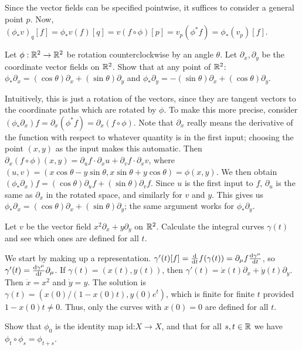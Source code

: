 {Since the vector fields can be specified pointwise, it suffices to consider a general point $p$. 
Now, $(\phi_*v)_q[f]=\phi_*v(f)[q]=v(f\circ\phi)[p]=v_p(\phi^*f)=\phi_*(v_p)[f]$.

\begin{p}
{Let $\phi:\mathbb{R}^2\rightarrow\mathbb{R}^2$ be rotation counterclockwise
by an angle $\theta$. Let $\partial_x,\partial_y$ be the coordinate vector fields on $\mathbb{R}^2$. 
Show that at any point of $\mathbb{R}^2$: $\phi_*\partial_x=(\cos\theta)\partial_x+(\sin\theta)\partial_y$
and $\phi_*\partial_y=-(\sin\theta)\partial_x+(\cos\theta)\partial_y$.}
\end{p}

Intuitively, this is just a rotation of the vectors, since they are tangent vectors to the coordinate paths
which are rotated by $\phi$. To make this more precise, consider $(\phi_*\partial_x)f=\partial_x(\phi^*f)=
\partial_x(f\circ\phi)$. Note that $\partial_x$ really means the derivative of the
function with respect to whatever quantity is in the first input; choosing the point $(x,y)$ as the input
makes this automatic. Then $\partial_x(f\circ\phi)(x,y)=\partial_uf \cdot \partial_x u+\partial_v f\cdot \partial_x v$, where $(u,v)=(x\cos\theta-y\sin\theta,x\sin\theta+y\cos\theta)=\phi(x,y)$. We then obtain
$(\phi_*\partial_x)f=(\cos\theta)\partial_u f+(\sin\theta)\partial_vf$. Since $u$ is the first input to $f$, $\partial_u$ is
the same as $\partial_x$ in the rotated space, and similarly for $v$ and $y$. This gives us
$\phi_*\partial_x=(\cos\theta)\partial_x+(\sin\theta)\partial_y$; the same argument works for $\phi_*\partial_y$.

\begin{p}{Let $v$ be the vector field $x^2\partial_x+y\partial_y$ on $\mathbb{R}^2$. Calculate 
the integral curves $\gamma(t)$ and see which ones are defined for all $t$.}
\end{p}

We start by making up a representation. $\gamma'(t)[f]=\frac{\rm d}{{\rm d}t}f(\gamma(t))
=\partial_\mu f\frac{{\rm d}\gamma^\mu}{{\rm d}t}$, so $\gamma'(t)=
\frac{{\rm d}\gamma^\mu}{{\rm d}t}\partial_\mu$. 
If $\gamma(t)=(x(t),y(t))$, then $\gamma'(t)=\dot{x}(t)\partial_x+\dot{y}(t)\partial_y$. 
Then $\dot{x}=x^2$ and $\dot{y}=y$. The solution is $\gamma(t)=(x(0)/(1-x(0)t),y(0)e^t)$, which
is finite for finite $t$ provided $1-x(0)t\neq 0$. Thus, only the curves with $x(0)=0$ are defined for all
$t$.

\begin{p}{Show that $\phi_0$ is the identity map id:$X\rightarrow X$, and that for all $s,t\in\mathbb{R}$ we have $\phi_t\circ\phi_s=\phi_{t+s}$.}
\end{p}

}
